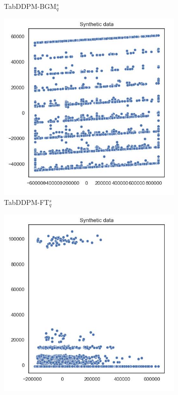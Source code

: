 \begin{figure}[h]
\begin{subfigure}{0.3\textwidth}
		\caption{TabDDPM-BGM$^{s}_q$}
	\end{subfigure}
	\begin{subfigure}{0.3\textwidth}
		\includegraphics[width=\textwidth]{images/pca/tab-ddpm-ft-simTune.jpg}
		\caption{TabDDPM-FT$^{s}_q$}
    \end{subfigure}
	\begin{subfigure}{0.3\textwidth}
		\includegraphics[width=\textwidth]{images/pca/tab-ddpm-bgm-simTune-minmax.jpg}

\end{subfigure}
\end{figure}

